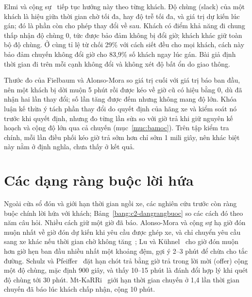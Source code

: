 Elmi và cộng sự~\cite{elmi2026} tiếp tục hướng này theo từng khách. Độ chùng (slack) của một khách là hiệu giữa thời
gian chờ tối đa, hay độ trễ tối đa, và giá trị dự kiến lúc gán; đó là phần còn cho phép thay đổi về sau. Khách có
điểm khả năng đi chung thấp nhận độ chùng 0, tức được bảo đảm không bị đổi giờ; khách khác giữ toàn bộ độ chùng. Ở
cùng tỉ lệ từ chối 29\% với cách siết đều cho mọi khách, cách này bảo đảm chuyến không đổi giờ cho 83,9\% số khách
ngay lúc gán. Bài giả định thời gian đi trên mỗi cạnh không đổi và không xét độ bất ổn do giao thông.

Thước đo của Fielbaum và Alonso-Mora so giá trị cuối với giá trị báo ban đầu, nên một khách bị dời muộn 5 phút rồi
được kéo về giờ cũ có hiệu bằng 0, dù đã nhận hai lần thay đổi; số lần tăng được đếm nhưng không mang độ lớn. Khóa
luận kế thừa ý tách phần thay đổi do quyết định của hãng xe và kiểm soát nó trước khi quyết định, nhưng đo từng lần
sửa so với giờ trả khi giữ nguyên kế hoạch và cộng độ lớn qua cả chuyến (mục~\ref{muc:bamoc}). Trên tập kiểm tra
chính, mỗi lần điều phối kéo giờ trả sớm hơn chỉ sớm 1 mili giây, nên khác biệt này nằm ở định nghĩa, chưa thấy ở
kết quả.

\section{Các dạng ràng buộc lời hứa}
\label{muc:c2-rangbuoc}

Ngoài cửa sổ đón và giới hạn thời gian ngồi xe, các nghiên cứu trước còn ràng buộc chính lời hứa với khách;
Bảng~\ref{bang:c2-dangrangbuoc} so các cách đó theo năm câu hỏi. Nhiều cách giữ một giờ đã báo. Alonso-Mora và cộng
sự hạ giờ đón muộn nhất về giờ đón dự kiến khi yêu cầu được ghép xe, và chỉ chuyển yêu cầu sang xe khác nếu thời
gian chờ không tăng~\cite{alonsomora2017}; Lu và Kühnel~\cite{lu2024} cho giờ đón muộn hơn giờ hẹn ban đầu nhiều
nhất một khoảng đệm, gợi ý 2--3 phút để chừa cho tắc đường. Schulz và Pfeiffer~\cite{schulz2026} đặt hạn chót trả
bằng giờ trả trong lời mời (offer) cộng một độ chùng, mặc định 900 giây, và thấy 10--15 phút là đánh đổi hợp lý khi
quét độ chùng tới 30 phút. Mt-KaRRi~\cite{laupichler2026} giới hạn thời gian chuyến ở 1,4 lần thời gian chuyến đã báo
lúc khách chấp nhận, cộng 10 phút.

